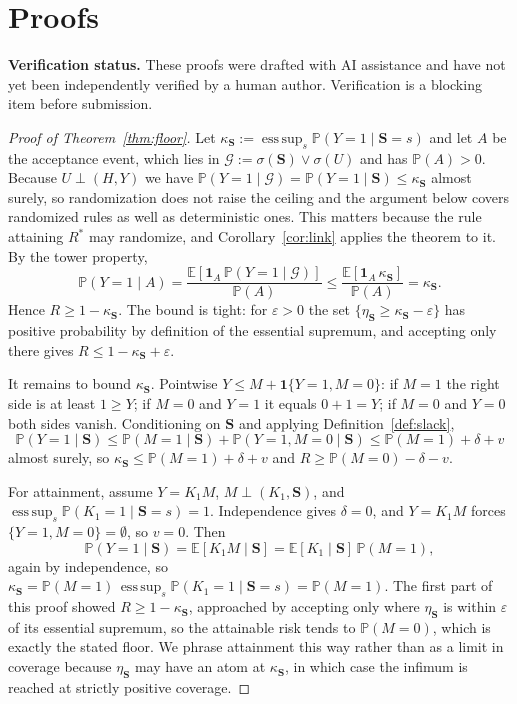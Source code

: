 \documentclass{article}
\newcommand{\esssup}{\operatorname*{ess\,sup}}
\newcommand{\gate}{\mathbf{S}}
\begin{document}


\newpage
\appendix

\section{Proofs}
\label{app:proofs}

\noindent\textbf{Verification status.} These proofs were drafted with AI assistance and have not yet
been independently verified by a human author. Verification is a blocking item before submission.

\begin{proof}[Proof of Theorem~\ref{thm:floor}]
Let $\kappa_{\gate}:=\esssup_s\mathbb{P}(Y=1\mid\gate=s)$ and let $A$ be the acceptance event, which
lies in $\mathcal{G}:=\sigma(\gate)\vee\sigma(U)$ and has $\mathbb{P}(A)>0$. Because
$U\perp(H,Y)$ we have $\mathbb{P}(Y=1\mid\mathcal{G})=\mathbb{P}(Y=1\mid\gate)\le\kappa_{\gate}$
almost surely, so randomization does not raise the ceiling and the argument below covers randomized
rules as well as deterministic ones. This matters because the rule attaining $R^\ast$ may randomize,
and Corollary~\ref{cor:link} applies the theorem to it. By the tower property,
\[
\mathbb{P}(Y=1\mid A)=\frac{\mathbb{E}[\mathbf{1}_A\,\mathbb{P}(Y=1\mid\mathcal{G})]}{\mathbb{P}(A)}
\le\frac{\mathbb{E}[\mathbf{1}_A\,\kappa_{\gate}]}{\mathbb{P}(A)}=\kappa_{\gate}.
\]
Hence $R\ge1-\kappa_{\gate}$. The bound is tight: for $\varepsilon>0$ the set
$\{\eta_{\gate}\ge\kappa_{\gate}-\varepsilon\}$ has positive probability by definition of the
essential supremum, and accepting only there gives $R\le1-\kappa_{\gate}+\varepsilon$.

It remains to bound $\kappa_{\gate}$. Pointwise $Y\le M+\mathbf{1}\{Y=1,M=0\}$: if $M=1$ the right
side is at least $1\ge Y$; if $M=0$ and $Y=1$ it equals $0+1=Y$; if $M=0$ and $Y=0$ both sides
vanish. Conditioning on $\gate$ and applying Definition~\ref{def:slack},
\[
\mathbb{P}(Y=1\mid\gate)\le\mathbb{P}(M=1\mid\gate)+\mathbb{P}(Y=1,M=0\mid\gate)
\le\mathbb{P}(M=1)+\delta+v
\]
almost surely, so $\kappa_{\gate}\le\mathbb{P}(M=1)+\delta+v$ and
$R\ge\mathbb{P}(M=0)-\delta-v$.

For attainment, assume $Y=K_1M$, $M\perp(K_1,\gate)$, and
$\esssup_s\mathbb{P}(K_1=1\mid\gate=s)=1$. Independence gives $\delta=0$, and $Y=K_1M$ forces
$\{Y=1,M=0\}=\emptyset$, so $v=0$. Then
\[
\mathbb{P}(Y=1\mid\gate)=\mathbb{E}[K_1M\mid\gate]=\mathbb{E}[K_1\mid\gate]\,\mathbb{P}(M=1),
\]
again by independence, so
$\kappa_{\gate}=\mathbb{P}(M=1)\,\esssup_s\mathbb{P}(K_1=1\mid\gate=s)=\mathbb{P}(M=1)$. The first
part of this proof showed $R\ge1-\kappa_{\gate}$, approached by accepting only where
$\eta_{\gate}$ is within $\varepsilon$ of its essential supremum, so the attainable risk tends to
$\mathbb{P}(M=0)$, which is exactly the stated floor. We phrase attainment this way rather than as a
limit in coverage because $\eta_{\gate}$ may have an atom at $\kappa_{\gate}$, in which case the
infimum is reached at strictly positive coverage.


\end{proof}
\end{document}
